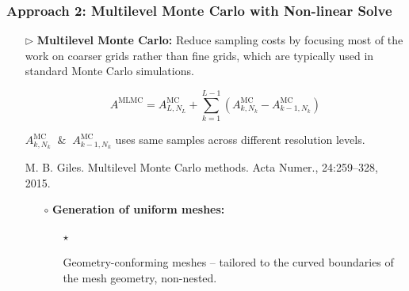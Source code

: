 \documentclass{beamer}
\begin{document}



\begin{frame}[t]
    \frametitle{Approach 2: Multilevel Monte Carlo with Non-linear Solve}
\begin{itemize}[leftmargin=5pt] 

\item[$\triangleright$] \textcolor{myblue3}{\bf Multilevel Monte Carlo:} {\footnotesize Reduce sampling costs by  focusing most of the work on coarser grids rather than fine grids,  which are typically used in standard Monte Carlo simulations.}
\vspace{-2mm}
{\fontsize{7}{7}\selectfont 
\begin{equation*}
    A^{\text{MLMC}} = A^{\text{MC}}_{L,N_L} +  \sum_{k=1}^{L-1} \left(A_{k,N_{k}}^{\text{MC}}- A_{k-1,N_k}^{\text{MC}}\right) 
\end{equation*}

\vspace{-1mm}
$A_{k,N_{k}}^{\text{MC}}\;\; \& \;\; A_{k-1,N_k}^{\text{MC}}$ uses same samples across different resolution levels.
}

{\fontsize{7}{7}\selectfont \textcolor{mygray2}{M. B. Giles. Multilevel Monte Carlo methods. Acta Numer., 24:259–328, 2015.}\par}

\vspace{2mm}
\begin{itemize}[leftmargin=7pt] 
    
    
\item [$\circ$] {\bf Generation of uniform meshes: }
{\footnotesize
\begin{itemize}[leftmargin=15pt]
\item[$\star$]  {\fontsize{9}{9}\selectfont \textcolor{myred}{Geometry-conforming meshes} -- tailored to the curved boundaries of the mesh geometry, \textcolor{myred}{non-nested}.\par}
\end{itemize}
}


\end{itemize}
\end{itemize}
\end{frame}
\end{document}

